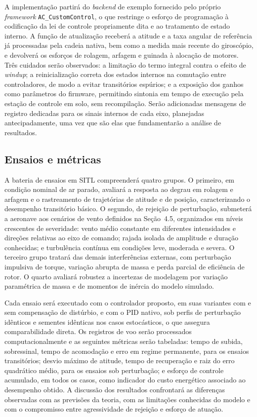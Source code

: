 \documentclass[12pt,a4paper]{article}
\begin{document}
A implementação partirá do \emph{backend} de exemplo fornecido pelo próprio
\emph{framework} \texttt{AC\_CustomControl}, o que restringe o esforço de programação
à codificação da lei de controle propriamente dita e ao tratamento de estado interno.
A função de atualização receberá a atitude e a taxa angular de referência já
processadas pela cadeia nativa, bem como a medida mais recente do giroscópio, e
devolverá os esforços de rolagem, arfagem e guinada à alocação de motores. Três
cuidados serão observados: a limitação do termo integral contra o efeito de
\emph{windup}; a reinicialização correta dos estados internos na comutação entre
controladores, de modo a evitar transitórios espúrios; e a exposição dos ganhos como
parâmetros do firmware, permitindo sintonia em tempo de execução pela estação de
controle em solo, sem recompilação. Serão adicionadas mensagens de registro
dedicadas para os sinais internos de cada eixo, planejadas antecipadamente, uma vez
que são elas que fundamentarão a análise de resultados.

\subsection{Ensaios e métricas}

A bateria de ensaios em SITL compreenderá quatro grupos. O primeiro, em condição
nominal de ar parado, avaliará a resposta ao degrau em rolagem e arfagem e o
rastreamento de trajetórias de atitude e de posição, caracterizando o desempenho
transitório básico. O segundo, de rejeição de perturbação, submeterá a aeronave aos
cenários de vento definidos na Seção~4.5, organizados em níveis crescentes de
severidade: vento médio constante em diferentes intensidades e direções relativas ao
eixo de comando; rajada isolada de amplitude e duração conhecidas; e turbulência
contínua em condições leve, moderada e severa. O terceiro grupo tratará das demais
interferências externas, com perturbação impulsiva de torque, variação abrupta de
massa e perda parcial de eficiência de rotor. O quarto avaliará robustez a
incertezas de modelagem por variação paramétrica de massa e de momentos de inércia
do modelo simulado.

Cada ensaio será executado com o controlador proposto, em suas variantes com e sem
compensação de distúrbio, e com o PID nativo, sob perfis de perturbação idênticos e
sementes idênticas nos casos estocásticos, o que assegura comparabilidade direta. Os
registros de voo serão processados computacionalmente e as seguintes métricas serão
tabeladas: tempo de subida, sobressinal, tempo de acomodação e erro em regime
permanente, para os ensaios transitórios; desvio máximo de atitude, tempo de
recuperação e raiz do erro quadrático médio, para os ensaios sob perturbação; e
esforço de controle acumulado, em todos os casos, como indicador do custo energético
associado ao desempenho obtido. A discussão dos resultados confrontará as diferenças
observadas com as previsões da teoria, com as limitações conhecidas do modelo e com o
compromisso entre agressividade de rejeição e esforço de atuação.
\end{document}
